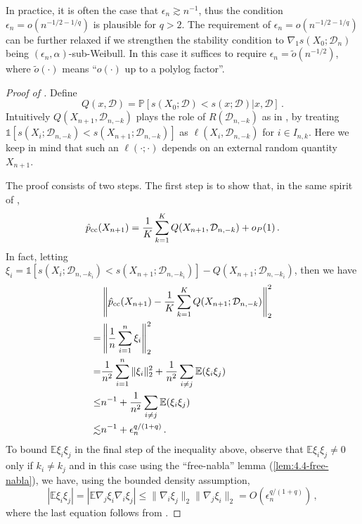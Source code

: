 \documentclass[11pt]{article}
\theoremstyle{plain}
\newcommand{\D}{{\mathcal{D}}}
\begin{document}
In practice, it is often the case that $\epsilon_n\gtrsim n^{-1}$, thus the condition $\epsilon_n=o(n^{-1/2-1/q})$ is plausible for $q>2$.
The requirement of $\epsilon_n=o(n^{-1/2-1/q})$ can be further relaxed if we strengthen the stability condition to $\nabla_1 s(X_0;\D_n)$ being $(\epsilon_n,\alpha)$-sub-Weibull. In this case it suffices to require $\epsilon_n=\tilde o(n^{-1/2})$, where $\tilde o(\cdot)$ means ``$o(\cdot)$ up to a polylog factor''.

\begin{proof}[Proof of ]
Define
$$Q(x,\D)=\mathbb P\left[s(X_0;\D)<s(x;\D)\bigg| x,\D\right]\,.$$
Intuitively $Q(X_{n+1},\D_{n,-k})$ plays the role of $R(\D_{n,-k})$ as in , by treating $\mathds{1}[s(X_i;\D_{n,-k})<s(X_{n+1};\D_{n,-k})]$ as $\ell(X_i,\D_{n,-k})$ for $i\in I_{n,k}$.  Here we keep in mind that such an
$\ell(\cdot;\cdot)$ depends on an external random quantity $X_{n+1}$.

The proof consists of two steps.
The first step is to show that, in the same spirit of ,
\begin{equation*}
    \hat p_{\rm cc}(X_{n+1}) = \frac{1}{K}\sum_{k=1}^K Q(X_{n+1},\D_{n,-k})+o_P(1)\,.
\end{equation*}
In fact, letting $\xi_i=\mathds{1}[s(X_i;\D_{n,-k_i})<s(X_{n+1};\D_{n,-k_i})]-Q(X_{n+1};\D_{n,-k_i})$, then we have
\begin{align}
 &    \left\|\hat p_{\rm cc}(X_{n+1})-\frac{1}{K}\sum_{k=1}^K Q(X_{n+1};\D_{n,-k})\right\|_2^2\nonumber\\
 =&\left\|\frac{1}{n}\sum_{i=1}^n \xi_i\right\|_2^2\nonumber\\
 =&\frac{1}{n^2}\sum_{i=1}^n\|\xi_i\|_2^2 +\frac{1}{n^2}\sum_{i\neq j}\mathbb E (\xi_i\xi_j)\nonumber\\
 \le & n^{-1}+\frac{1}{n^2}\sum_{i\neq j}\mathbb E(\xi_i\xi_j)\nonumber\\
 \lesssim & n^{-1}+\epsilon_n^{q/(1+q)}\,.\label{eq:5.5-step1}
\end{align}
To bound $\mathbb E\xi_i\xi_j$ in the final step of the inequality above, observe that $\mathbb E \xi_i\xi_j\neq 0$ only if $k_i\neq k_j$ and in this case using the ``free-nabla'' lemma (\ref{lem:4.4-free-nabla}), we have, using the bounded density assumption,
$$
|\mathbb E \xi_i\xi_j| = |\mathbb E \nabla_j\xi_i\nabla_i\xi_j|\le \|\nabla_i\xi_j\|_2\|\nabla_j\xi_i\|_2=O(\epsilon_n^{q/(1+q)})\,,
$$
where the last equation follows from .


\end{proof}
\end{document}
